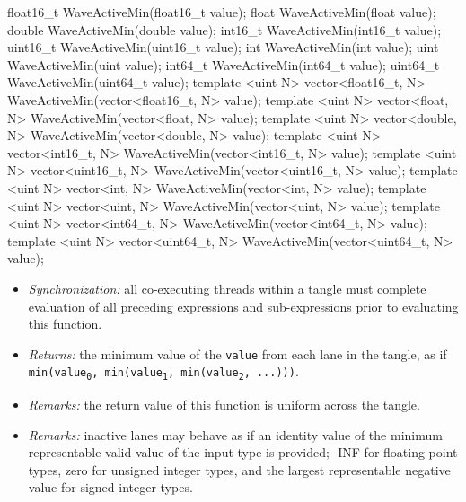 \begin{HLSL}
float16_t WaveActiveMin(float16_t value);
float WaveActiveMin(float value);
double WaveActiveMin(double value);
int16_t WaveActiveMin(int16_t value);
uint16_t WaveActiveMin(uint16_t value);
int WaveActiveMin(int value);
uint WaveActiveMin(uint value);
int64_t WaveActiveMin(int64_t value);
uint64_t WaveActiveMin(uint64_t value);
template <uint N> vector<float16_t, N> WaveActiveMin(vector<float16_t, N> value);
template <uint N> vector<float, N> WaveActiveMin(vector<float, N> value);
template <uint N> vector<double, N> WaveActiveMin(vector<double, N> value);
template <uint N> vector<int16_t, N> WaveActiveMin(vector<int16_t, N> value);
template <uint N> vector<uint16_t, N> WaveActiveMin(vector<uint16_t, N> value);
template <uint N> vector<int, N> WaveActiveMin(vector<int, N> value);
template <uint N> vector<uint, N> WaveActiveMin(vector<uint, N> value);
template <uint N> vector<int64_t, N> WaveActiveMin(vector<int64_t, N> value);
template <uint N> vector<uint64_t, N> WaveActiveMin(vector<uint64_t, N> value);
\end{HLSL}

\begin{itemize}
  \item \textit{Synchronization:} all co-executing threads within a \gls{tangle}
  must complete evaluation of all preceding expressions and sub-expressions
  prior to evaluating this function.
  \item \textit{Returns:} the minimum value of the \texttt{value} from each
  \gls{lane} in the \gls{tangle}, as if \texttt{min(value\textsubscript{0},
  min(value\textsubscript{1}, min(value\textsubscript{2}, ...)))}.
  \item \textit{Remarks:} the return value of this function is uniform across
  the \gls{tangle}.
  \item \textit{Remarks:} inactive \gls{lane}s may behave as if an identity
  value of the minimum representable valid value of the input type is provided;
  -INF for floating point types, zero for unsigned integer types, and the
  largest representable negative value for signed integer types.
\end{itemize}

